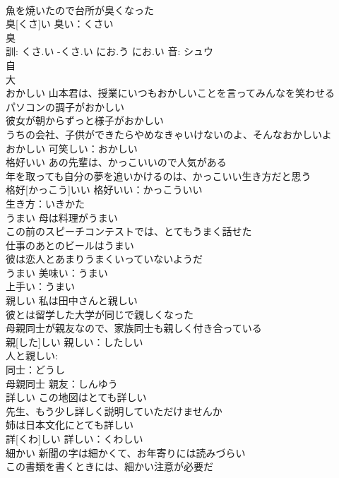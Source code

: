 \documentclass[8pt]{extreport}
\begin{document}
\begin{CJK}{UTF8}{min}
\\	魚を焼いたので台所が臭くなった 
\\	臭[くさ]い			臭い：くさい
\\	臭 
\\	訓: くさ.い -くさ.い にお.う にお.い 音: シュウ 
\\	自 
\\	大 
\\	おかしい	山本君は、授業にいつもおかしいことを言ってみんなを笑わせる 
\\	パソコンの調子がおかしい 
\\	彼女が朝からずっと様子がおかしい 
\\	うちの会社、子供ができたらやめなきゃいけないのよ、そんなおかしいよ 
\\	おかしい			可笑しい：おかしい
\\	格好いい	あの先輩は、かっこいいので人気がある 
\\	年を取っても自分の夢を追いかけるのは、かっこいい生き方だと思う 
\\	格好[かっこう]いい			格好いい：かっこういい
\\	生き方：いきかた
\\	うまい	母は料理がうまい 
\\	この前のスピーチコンテストでは、とてもうまく話せた 
\\	仕事のあとのビールはうまい 
\\	彼は恋人とあまりうまくいっていないようだ 
\\	うまい			美味い：うまい
\\	上手い：うまい
\\	親しい	私は田中さんと親しい 
\\	彼とは留学した大学が同じで親しくなった 
\\	母親同士が親友なので、家族同士も親しく付き合っている 
\\	親[した]しい			親しい：したしい
\\	人と親しい:
\\	同士：どうし
\\	母親同士 親友：しんゆう
\\	詳しい	この地図はとても詳しい 
\\	先生、もう少し詳しく説明していただけませんか 
\\	姉は日本文化にとても詳しい 
\\	詳[くわ]しい			詳しい：くわしい
\\	細かい	新聞の字は細かくて、お年寄りには読みづらい 
\\	この書類を書くときには、細かい注意が必要だ 

\end{CJK}
\end{document}
